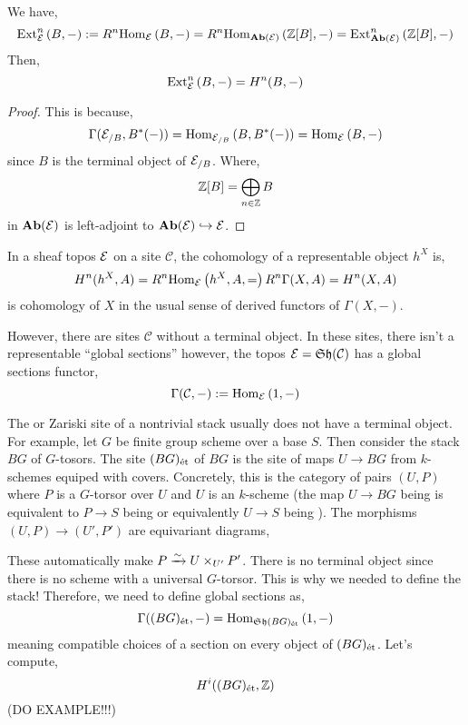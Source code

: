 \documentclass[12pt]{article}
\renewcommand{\C}{\mathcal{C}}
\begin{document}
\begin{prop}
We have,
\[ \mathrm{Ext}^{n}_{\mathcal{E}} \left( B, - \right) := R^n \mathrm{Hom}_{\mathcal{E}} \left( B, - \right) = R^n \mathrm{Hom}_{\mathbf{Ab}(\mathcal{E})} \left( \mathbb{Z}[B], - \right) = \mathrm{Ext}^{n}_{\mathbf{Ab}(\mathcal{E})} \left( \mathbb{Z}[B], - \right) \]
Then,
\[ \mathrm{Ext}^{n}_{\mathcal{E}} \left( B, - \right) = H^n(B, -) \]
\end{prop}

\begin{proof}
This is because,
\[ \Gamma(\mathcal{E}_{/B}, B^*(-)) = \mathrm{Hom}_{\mathcal{E}_{/B}} \left( B, B^*(-) \right) = \mathrm{Hom}_{\mathcal{E}} \left( B, - \right) \]
since $B$ is the terminal object of $\mathcal{E}_{/B}$. Where,
\[ \mathbb{Z}[B] = \bigoplus_{n \in \mathbb{Z}} B \]
in $\mathbf{Ab}(\mathcal{E})$ is left-adjoint to $\mathbf{Ab}(\mathcal{E}) \hookrightarrow \mathcal{E}$.
\end{proof}

\begin{example}
In a sheaf topos $\mathcal{E}$ on a site $\C$, the cohomology of a representable object $h^X$ is,
\[ H^n(h^X, A) = R^n \mathrm{Hom}_{\mathcal{E}} \left( h^X, A, = \right) R^n \Gamma(X, A) = H^n(X, A) \]
is cohomology of $X$ in the usual sense of derived functors of $\Gamma(X, -)$. 
\end{example}

\begin{rmk}
However, there are sites $\C$ without a terminal object. In these sites, there isn't a representable ``global sections'' however, the topos $\E = \Sh(\C)$ has a global sections functor,
\[ \Gamma(\C, -) := \Hom{\E}{1}{-} \]
\end{rmk}

\begin{example}
The \etale or Zariski site of a nontrivial stack usually does not have a terminal object. For example, let $G$ be finite \etale group scheme over a base $S$. Then consider the stack $BG$ of $G$-tosors. The \etale site $(BG)_{\text{\'{e}t}}$ of $BG$ is the site of \etale maps $U \to BG$ from $k$-schemes equiped with \etale covers. Concretely, this is the category of pairs $(U, P)$ where $P$ is a $G$-torsor over $U$ and $U$ is an \etale $k$-scheme (the map $U \to BG$ being \etale is equivalent to $P \to S$ being \etale or equivalently $U \to S$ being \etale). The morphisms $(U, P) \to (U', P')$ are equivariant diagrams,
\begin{center}
\end{center}
These automatically make $P \xrightarrow{\sim} U \times_{U'} P'$. There is no terminal object since there is no scheme with a universal $G$-torsor. This is why we needed to define the stack! Therefore, we need to define global sections as,
\[ \Gamma((BG)_{\text{\'{e}t}}, -) = \mathrm{Hom}_{\mathfrak{Sh}{(BG)_{\text{\'{e}t}}}} \left( 1, - \right) \]
meaning compatible choices of a section on every object of $(BG)_{\text{\'{e}t}}$. Let's compute,
\[ H^i((BG)_{\text{\'{e}t}}, \mathbb{Z}) \] 
(DO EXAMPLE!!!)
\end{example}
\end{document}
